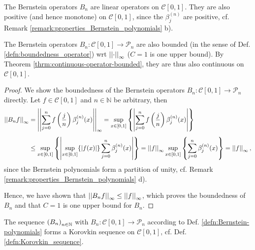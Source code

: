 \begin{remark}
	The Bernstein operators $B_n$ are linear operators on $\mathcal C[0, 1]$. They are also positive (and hence monotone) on $\mathcal C[0, 1]$, since the $\beta_{j}^{(n)}$ are positive, cf. Remark \ref{remark:properties_Bernstein_polynomials} b).
\end{remark}

\begin{remark}
	The Bernstein operators $B_n: \mathcal C[0, 1]\to\mathcal P_n$ are also bounded (in the sense of Def. \ref{defn:boundedness_operator}) wrt $\norm{\cdot}{\infty}$ ($C=1$ is one upper bound). By Theorem \ref{thrm:continuous-operator-bounded}, they are thus also continuous on $\mathcal C [0, 1]$.
\end{remark}

\begin{proof}
	We show the boundedness of the Bernstein operators $B_n: \mathcal C[0, 1]\to \mathcal P_n$ directly. Let $f\in\mathcal C[0, 1]$ and $n\in\mathbb N$ be arbitrary, then
	\begin{align}
		\norm{B_nf}{\infty} &= \norm{\sum_{j=0}^{n}f\left(\frac{j}{n}\right)\beta_j^{(n)}(x)}{\infty} = \sup_{x\in[0, 1]}\left\{\abs{\sum_{j=0}^{n}f\left(\frac{j}{n}\right)\beta_{j}^{(n)}(x)}\right\}
		\\[4pt] &\leq \sup_{x\in[0, 1]}\left\{\abs{\sup_{x\in[0, 1]}\{\abs{f(x)}\}\sum_{j=0}^{n}\beta_{j}^{(n)}(x)}\right\} = \norm{f}{\infty}\sup_{x\in[0, 1]}\left\{\sum_{j=0}^{n}\beta_{j}^{(n)}(x)\right\} = \norm{f}{\infty},
	\end{align}
	since the Bernstein polynomials form a partition of unity, cf. Remark \ref{remark:properties_Bernstein_polynomials} d). 
	
	Hence, we have shown that $\norm{B_nf}{\infty} \leq \norm{f}{\infty}$, which proves the boundedness of $B_n$ and that $C = 1$ is one upper bound for $B_n$.
\end{proof}

\begin{theorem}\label{thrm:bernstein_operators_korovkin_sequence}
	The sequence $\seq[B_n]$ with $B_n: \mathcal C[0, 1]\to \mathcal P_n$ according to Def. \ref{defn:Bernstein-polynomials} forms a Korovkin sequence on $\mathcal C[0, 1]$, cf. Def. \ref{defn:Korovkin_sequence}.
\end{theorem}

